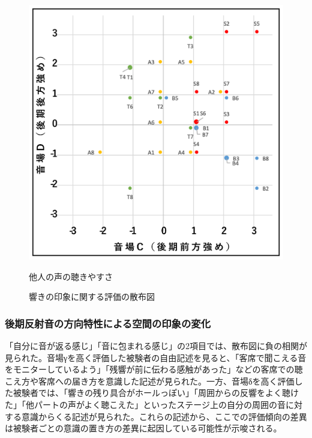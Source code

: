 \documentclass[11pt,a4j]{jreport}
\begin{document}
\begin{figure}[H]
  \begin{minipage}{1\linewidth}
    \centering
    \includegraphics[width=.45\linewidth]{images/subjectiveExp/scat_late_03othersVoice.png}
    \caption*{他人の声の聴きやすさ}
  \end{minipage}
  \caption{響きの印象に関する評価の散布図}
  \label{fig:響きの印象に関する評価の散布図}
\end{figure}


\newpage
\subsubsection*{後期反射音の方向特性による空間の印象の変化}
「自分に音が返る感じ」「音に包まれる感じ」の2項目では、散布図に負の相関が見られた。音場γを高く評価した被験者の自由記述を見ると、「客席で聞こえる音をモニターしているよう」「残響が前に伝わる感触があった」などの客席での聴こえ方や客席への届き方を意識した記述が見られた。一方、音場δを高く評価した被験者では、「響きの残り具合がホールっぽい」「周囲からの反響をよく聴けた」「他パートの声がよく聴こえた」といったステージ上の自分の周囲の音に対する意識からくる記述が見られた。これらの記述から、ここでの評価傾向の差異は被験者ごとの意識の置き方の差異に起因している可能性が示唆される。

\end{document}
